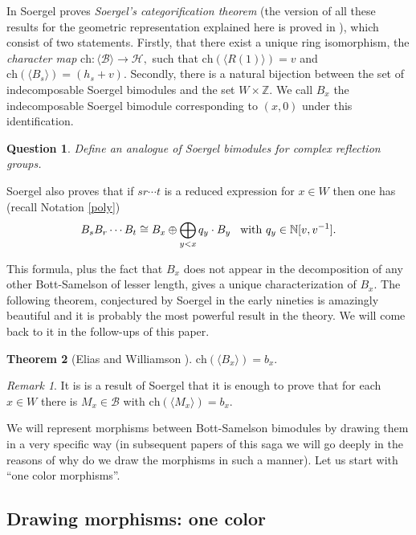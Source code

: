 \documentclass[12pt]{wart}
\newtheorem{thm}{Theorem}[section]
\newtheorem{ques}[thm]{Question}
\theoremstyle{remark}
\newtheorem{remark}{Remark}
\begin{document}
In \cite{So0} Soergel proves \emph{Soergel's categorification theorem} (the version of all these results for the geometric representation explained here is proved in \cite{li2}), which consist of two statements. Firstly, that there exist a unique ring isomorphism, the \emph{character map}
$\mathrm{ch}:  \langle \mathcal{B}\rangle \rightarrow \mathcal{H},$
such that $\mathrm{ch}(\langle R(1)\rangle)=v$ and $\mathrm{ch}(\langle B_s \rangle)=(h_s+v)$.
Secondly, there is a natural bijection between the set of indecomposable Soergel bimodules and the set $W\times \mathbb{Z}.$ We call $B_x$ the indecomposable Soergel bimodule corresponding to $(x,0)$ under this identification.  


\begin{ques} Define an analogue of Soergel bimodules for  complex reflection groups.
\end{ques}


Soergel also proves that if $sr\cdots t$ is a reduced expression for $x\in W$ then 
one has (recall Notation \ref{poly})$$ B_sB_r\cdots B_t\cong B_x\oplus \bigoplus_{y<x}q_y\cdot  B_y\hspace{.3cm}\mathrm{with }\ q_y\in \mathbb N[v, v^{-1}].  $$

This formula, plus the fact that $B_x$ does not appear in the decomposition of any other Bott-Samelson of lesser length, gives a unique characterization of $B_x$. The following theorem, conjectured by Soergel in the early nineties is amazingly beautiful and it is probably the most powerful result in the theory. We will come back to it in the follow-ups of this paper. 

\begin{thm}[Elias and Williamson \cite{EW}]
$\mathrm{ch}(\langle B_x \rangle)=b_x.$
\end{thm}

\begin{remark}
It is is a result of Soergel that it is enough to prove that for each $x\in W$ there is  $M_x\in \mathcal{B}$ with $\mathrm{ch}(\langle M_x \rangle)=b_x.$ 
\end{remark}

We will represent morphisms between Bott-Samelson bimodules by drawing them in a very specific way (in subsequent papers of this saga we will go deeply in the reasons of why do we draw the morphisms in such a manner).  Let us start with ``one color morphisms''. 





\subsection{Drawing morphisms: one color}
\end{document}
